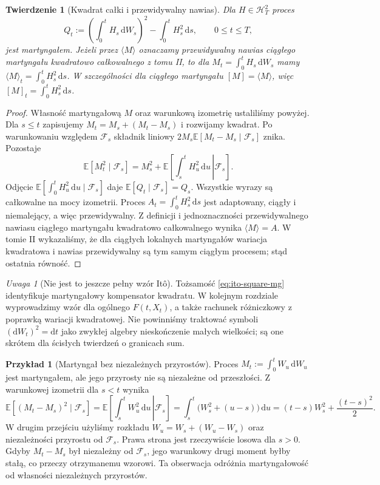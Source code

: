 \documentclass[11pt,a4paper,oneside]{report}
\numberwithin{equation}{chapter}
\theoremstyle{plain}
\newtheorem{twierdzenie}{Twierdzenie}[chapter]
\theoremstyle{definition}
\newtheorem{przyklad}{Przykład}[chapter]
\theoremstyle{remark}
\newtheorem{uwaga}{Uwaga}[chapter]
\newcommand{\E}{\mathbb{E}}
\newcommand{\calF}{\mathcal{F}}
\newcommand{\calH}{\mathcal{H}}
\newcommand{\dd}{\mathrm{d}}
\begin{document}
\begin{twierdzenie}[Kwadrat całki i przewidywalny nawias]
\label{th:ito-bracket}
Dla $H\in\calH_T^2$ proces
\[
Q_t:=\left(\int_0^tH_s\,\dd W_s\right)^2
-\int_0^tH_s^2\,\dd s,\qquad 0\le t\le T,
\tag{2.10}\label{eq:ito-square-mg}
\]
jest martyngałem. Jeżeli przez $\langle M\rangle$
oznaczamy przewidywalny nawias ciągłego martyngału
kwadratowo całkowalnego z tomu II, to dla
$M_t=\int_0^tH_s\,\dd W_s$ mamy
$\langle M\rangle_t=\int_0^tH_s^2\,\dd s$.
W szczególności dla ciągłego martyngału
$[M]=\langle M\rangle$, więc
$[M]_t=\int_0^tH_s^2\,\dd s$.
\end{twierdzenie}
\begin{proof}
Własność martyngałową $M$ oraz warunkową izometrię
ustaliliśmy powyżej. Dla $s\le t$ zapisujemy
$M_t=M_s+(M_t-M_s)$ i rozwijamy kwadrat.
Po warunkowaniu względem $\calF_s$ składnik liniowy
$2M_s\E[M_t-M_s\mid\calF_s]$ znika. Pozostaje
\[
\E[M_t^2\mid\calF_s]
=M_s^2+\E\left[\left.\int_s^tH_u^2\,\dd u\,\right|\calF_s\right].
\]
Odjęcie $\E[\int_0^tH_u^2\,\dd u\mid\calF_s]$
daje $\E[Q_t\mid\calF_s]=Q_s$. Wszystkie wyrazy
są całkowalne na mocy izometrii.
Proces $A_t=\int_0^tH_s^2\,\dd s$ jest adaptowany,
ciągły i niemalejący, a więc przewidywalny.
Z definicji i jednoznaczności przewidywalnego nawiasu
ciągłego martyngału kwadratowo całkowalnego wynika
$\langle M\rangle=A$. W tomie II wykazaliśmy,
że dla ciągłych lokalnych martyngałów wariacja
kwadratowa i nawias przewidywalny są tym samym
ciągłym procesem; stąd ostatnia równość.
\end{proof}

\begin{uwaga}[Nie jest to jeszcze pełny wzór Itô]
Tożsamość \eqref{eq:ito-square-mg} identyfikuje
martyngałowy kompensator kwadratu. W kolejnym rozdziale
wyprowadzimy wzór dla ogólnego $F(t,X_t)$, a także
rachunek różniczkowy z poprawką wariacji kwadratowej.
Nie powinniśmy traktować symboli $(\dd W_t)^2=\dd t$
jako zwykłej algebry nieskończenie małych wielkości;
są one skrótem dla ścisłych twierdzeń o granicach sum.
\end{uwaga}


\begin{przyklad}[Martyngał bez niezależnych przyrostów]
Proces $M_t:=\int_0^tW_u\,\dd W_u$
jest martyngałem, ale jego przyrosty nie są niezależne
od przeszłości. Z warunkowej izometrii dla $s<t$
wynika
\[
\E[(M_t-M_s)^2\mid\calF_s]
=\E\left[\left.\int_s^tW_u^2\,\dd u\,\right|\calF_s\right]
=\int_s^t\big(W_s^2+(u-s)\big)\,\dd u
=(t-s)W_s^2+\frac{(t-s)^2}{2}.
\]
W drugim przejściu użyliśmy rozkładu
$W_u=W_s+(W_u-W_s)$ oraz niezależności
przyrostu od $\calF_s$. Prawa strona jest
rzeczywiście losowa dla $s>0$. Gdyby
$M_t-M_s$ był niezależny od $\calF_s$, jego
warunkowy drugi moment byłby stałą, co przeczy
otrzymanemu wzorowi. Ta obserwacja odróżnia
martyngałowość od własności niezależnych przyrostów.
\end{przyklad}
\end{document}
